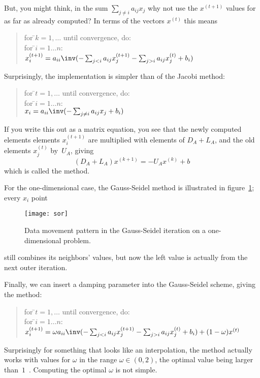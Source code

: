 But, you might think, in the sum $\sum_{j\not=i} a_{ij}x_j$ why
not use the $x^{(t+1)}$ values for as far as already computed?
In terms of the vectors $x^{(t)}$ this means
\begin{quote}
  \begin{tabbing}
    for \=$k=1,\ldots$ until convergence, do:\\
    \>for \=$i=1\ldots n$:\\
    \>\>$x^{(t+1)}_i = a_{ii}\inv (-\sum_{j<i} a_{ij}x_j^{(t+1)} -
                      \sum_{j>i} a_{ij}x_j^{(t)}+b_i)$\\
  \end{tabbing}
\end{quote}
Surprisingly, the implementation is simpler than of the Jacobi method:
\begin{quote}
  \begin{tabbing}
    for \=$t=1,\ldots$ until convergence, do:\\
    \>for \=$i=1\ldots n$:\\
    \>\>$x_i = a_{ii}\inv (-\sum_{j\not=i} a_{ij}x_j +b_i)$\\
  \end{tabbing}
\end{quote}
If you write this out as a matrix equation, you see that
the newly computed elements elements $x^{(t+1)}_i$ are 
multiplied with elements of $D_A+L_A$,
and the old elements $x^{(t)}_j$ by~$U_A$, giving
\[ (D_A+L_A)x^{(k+1)}=-U_Ax^{(k)}+b \]
which is called the  method.

For the one-dimensional case, the Gauss-Seidel method
is illustrated in figure~\ref{fig:1d-sor}; every $x_i$ point
\begin{figure}[ht]
  \texttt{[image: sor]}
  \caption{Data movement pattern in the Gauss-Seidel iteration on a
    one-dimensional problem.}
  \label{fig:1d-sor}
\end{figure}
still combines its neighbors' values, but now the left value is
actually from the next outer iteration.

Finally, we can insert a damping parameter into the Gauss-Seidel
scheme, giving the  method:
\begin{quote}
  \begin{tabbing}
    for \=$t=1,\ldots$ until convergence, do:\\
    \>for \=$i=1\ldots n$:\\
    \>\>$x^{(t+1)}_i = \omega a_{ii}\inv (-\sum_{j<i} a_{ij}x_j^{(t+1)} -
                      \sum_{j>i} a_{ij}x_j^{(t)} + b_i)
        +(1-\omega)x^{(t)}$\\
  \end{tabbing}
\end{quote}
Surprisingly for something that looks like an interpolation, the
method actually works with values for $\omega$ in the range
$\omega\in(0,2)$, the optimal value being larger
than~$1$~\cite{HaYo:applied}. Computing the optimal $\omega$ is not
simple.

